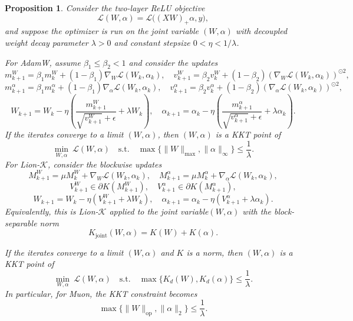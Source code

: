 \documentclass{article}
\newtheorem{proposition}{Proposition}[section]
\begin{document}
\begin{proposition}
\label{appxprop2:decoupleweights}
Consider the two-layer ReLU objective
\[
    \mathcal L(W,\alpha)
    =
    \mathcal L\big((XW)_+\alpha,y\big),
\]
and suppose the optimizer is run on the joint variable $(W,\alpha)$ with
decoupled weight decay parameter $\lambda>0$ and constant stepsize
$0<\eta<1/\lambda$.

For AdamW, assume $\beta_1\le \beta_2<1$ and consider the updates
\[
m_{k+1}^W=\beta_1m_k^W+(1-\beta_1)\nabla_W\mathcal L(W_k,\alpha_k),
\quad
v_{k+1}^W=\beta_2v_k^W+(1-\beta_2)(\nabla_W\mathcal L(W_k,\alpha_k))^{\odot 2},
\]
\[
m_{k+1}^\alpha=\beta_1m_k^\alpha+(1-\beta_1)\nabla_\alpha\mathcal L(W_k,\alpha_k),
\quad
v_{k+1}^\alpha=\beta_2v_k^\alpha+(1-\beta_2)(\nabla_\alpha\mathcal L(W_k,\alpha_k))^{\odot 2},
\]
\[
W_{k+1}
=
W_k-\eta\left(
\frac{m_{k+1}^W}{\sqrt{v_{k+1}^W}+\epsilon}
+\lambda W_k
\right),
\quad 
\alpha_{k+1}
=
\alpha_k-\eta\left(
\frac{m_{k+1}^\alpha}{\sqrt{v_{k+1}^\alpha}+\epsilon}
+\lambda \alpha_k
\right).
\]
If the iterates converge to a limit $(W,\alpha)$, then
$(W,\alpha)$ is a KKT point of
\[
    \min_{W,\alpha}\ \mathcal L(W,\alpha)
    \quad
    \mathrm{s.t.}
    \quad
    \max\{\|W\|_{\max},\|\alpha\|_\infty\}
    \le \frac1\lambda .
\]
For Lion-$\mathcal K$, consider the blockwise updates
\[
M_{k+1}^W=\mu M_k^W+\nabla_W\mathcal L(W_k,\alpha_k),\quad M_{k+1}^\alpha=\mu M_k^\alpha+\nabla_\alpha\mathcal L(W_k,\alpha_k),
\]
\[V_{k+1}^W\in \partial K(M_{k+1}^W),\quad V_{k+1}^\alpha\in \partial K(M_{k+1}^\alpha),
\]
\[W_{k+1}=W_k-\eta\left(V_{k+1}^W+\lambda W_k\right),\quad \alpha_{k+1}=\alpha_k-\eta\left(V_{k+1}^\alpha+\lambda\alpha_k\right).
\]
Equivalently, this is Lion-$\mathcal K$ applied to the joint variable$(W,\alpha)$ with the block-separable norm\[K_{\mathrm{joint}}(W,\alpha)=K(W)+K(\alpha).\]

If the iterates converge to a limit $(W,\alpha)$ and $K$ is a norm, then $(W,\alpha)$ is a KKT point of
\[    
    \min_{W,\alpha}\ \mathcal L(W,\alpha)    
    \quad    \mathrm{s.t.}    
    \quad    \max\{K_{d}(W),K_{d}(\alpha)\}    \le \frac1\lambda .
\]    
In particular, for Muon, the KKT constraint becomes\[    \max\{\|W\|_{\mathrm{op}},\|\alpha\|_2\}    \le \frac1\lambda .\]
\end{proposition}
\end{document}

